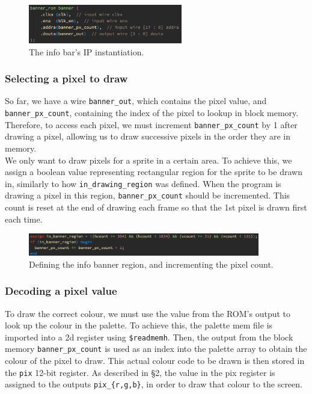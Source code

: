 \documentclass{ifda}
\begin{document}
\begin{figure}[h]
    \centering
    \includegraphics[width=0.6\textwidth]{ banner }
    \caption{The info bar's IP instantiation.}
    \label{fig:sync_assignment}
\end{figure}

\subsubsection{Selecting a pixel to draw}
So far, we have a wire \verb|banner_out|, which contains the pixel value, and \verb|banner_px_count|, containing the index of the pixel to lookup in block memory. Therefore, to access each pixel, we must increment \verb|banner_px_count| by 1 after drawing a pixel, allowing us to draw successive pixels in the order they are in memory.\\

We only want to draw pixels for a sprite in a certain area. To achieve this, we assign a boolean value representing rectangular region for the sprite to be drawn in, similarly to how \verb|in_drawing_region| was defined. When the program is drawing a pixel in this region, \verb|banner_px_count| should be incremented. This count is reset at the end of drawing each frame so that the 1st pixel is drawn first each time.\\

\begin{figure}[h]
    \centering
    \includegraphics[width=0.9\textwidth]{ increment }
    \caption{Defining the info banner region, and incrementing the pixel count.}
    \label{fig:sync_assignment}
\end{figure}

\subsubsection{Decoding a pixel value}
To draw the correct colour, we must use the value from the ROM's output to look up the colour in the palette. To achieve this, the palette mem file is imported into a 2d register using \verb|$readmemh|. Then, the output from the block memory \verb|banner_px_count| is used as an index into the palette array to obtain the colour of the pixel to draw. This actual colour code to be drawn is then stored in the \verb|pix| 12-bit register. As described in §2, the value in the pix register is assigned to the outputs \verb|pix_{r,g,b}|, in order to draw that colour to the screen.\\
\end{document}
